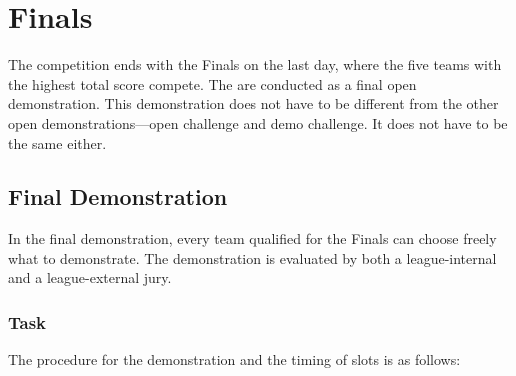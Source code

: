 \chapter{Finals}

The competition ends with the Finals on the last day, where the five teams with the highest total score compete.
The  are conducted as a final open demonstration.
This demonstration does not have to be different from the other open demonstrations---open challenge and demo challenge. 
It does not have to be the same either.

\section{Final Demonstration}
In the final demonstration, every team qualified for the Finals can choose freely what to demonstrate. 
The demonstration is evaluated by both a league-internal and a league-external jury.

\subsection{Task}
The procedure for the demonstration and the timing of slots is as follows:

